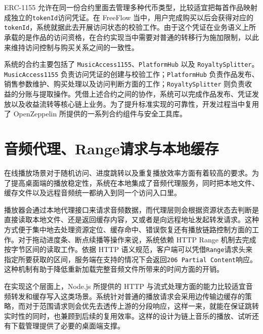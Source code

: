 ERC-1155 允许在同一份合约里面去管理多种代币类型，比较适宜把每首作品映射成独立的\texttt{tokenId}访问凭证。在 FreeFlow 当中，用户完成购买以后会获得对应的\texttt{tokenId}，系统就据此去开展访问状态的校验工作。由于这个凭证在业务语义上所承载的是作品的访问资格，在合约实现当中需要对普通的转移行为施加限制，以此来维持访问控制与购买关系之间的一致性。

系统的合约主要包括了 \texttt{MusicAccess1155}、\texttt{PlatformHub} 以及 \texttt{RoyaltySplitter}。\texttt{MusicAccess1155} 负责访问凭证的创建与校验工作；\texttt{PlatformHub} 负责作品发布、销售参数维护、购买处理以及访问判断方面的工作；\texttt{RoyaltySplitter} 则负责收益的分账与提取操作。凭借上述合约之间的协作，系统可以完成作品发布、凭证发放以及收益流转等核心链上业务。为了提升标准实现的可靠性，开发过程当中复用了 OpenZeppelin 所提供的一系列合约组件与安全工具库\cite{openzeppelinContracts}。

\section{音频代理、Range请求与本地缓存}

在线播放场景对于随机访问、进度跳转以及重复播放效率方面有着较高的要求。为了提高桌面端的播放稳定性，系统在本地集成了音频代理服务，同时把本地文件、缓存文件以及远程音频统一都纳入到同一个访问入口里。

播放器会通过本地代理接口来请求音频数据，而代理层则会根据资源状态去判断是直接读取本地文件、还是返回缓存内容，又或者是向远程地址发起转发请求。这种方式便于集中地去处理资源定位、缓存命中、错误恢复还有播放链路控制方面的工作。对于拖动进度条、断点续播等操作来说，系统依赖 HTTP Range 机制去完成按字节区间的读取工作。依据 HTTP 语义规范，客户端可以凭借\texttt{Range}请求头来指定所要获取的区间，服务端在支持的情况下会返回\texttt{206 Partial Content}响应\cite{rfc9110}。这种机制有助于降低重新加载完整音频文件所带来的时间方面的开销。

在实现这个层面上，Node.js 所提供的 HTTP 与流式处理方面的能力比较适宜音频转发和缓存写入这类场景\cite{nodeHttp,nodeStream}。系统针对普通的播放请求会采用边传输边缓存的策略，而对于范围请求则会优先去透传上游的分段响应，这样一来，就能在保证跳转实时性的同时，也兼顾到后续的复用效率。这样的设计为链上音乐的播放、试听还有下载管理提供了必要的桌面端支撑。

